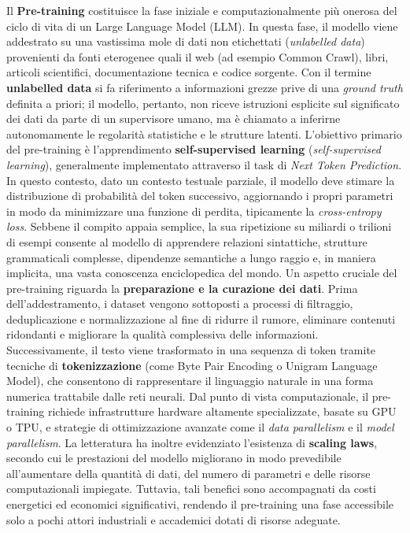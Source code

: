 Il \textbf{Pre-training} costituisce la fase iniziale e computazionalmente più onerosa del ciclo di vita di un Large Language Model (LLM). In questa fase, il modello viene addestrato su una vastissima mole di dati non etichettati (\textit{unlabelled data}) provenienti da fonti eterogenee quali il web (ad esempio Common Crawl), libri, articoli scientifici, documentazione tecnica e codice sorgente. Con il termine \textbf{unlabelled data} si fa riferimento a informazioni grezze prive di una \textit{ground truth} definita a priori; il modello, pertanto, non riceve istruzioni esplicite sul significato dei dati da parte di un supervisore umano, ma è chiamato a inferirne autonomamente le regolarità statistiche e le strutture latenti.
L'obiettivo primario del pre-training è l'apprendimento \textbf{self-supervised learning} (\textit{self-supervised learning}), generalmente implementato attraverso il task di \textit{Next Token Prediction}. In questo contesto, dato un contesto testuale parziale, il modello deve stimare la distribuzione di probabilità del token successivo, aggiornando i propri parametri in modo da minimizzare una funzione di perdita, tipicamente la \textit{cross-entropy loss}. Sebbene il compito appaia semplice, la sua ripetizione su miliardi o trilioni di esempi consente al modello di apprendere relazioni sintattiche, strutture grammaticali complesse, dipendenze semantiche a lungo raggio e, in maniera implicita, una vasta conoscenza enciclopedica del mondo.
Un aspetto cruciale del pre-training riguarda la \textbf{preparazione e la curazione dei dati}. Prima dell’addestramento, i dataset vengono sottoposti a processi di filtraggio, deduplicazione e normalizzazione al fine di ridurre il rumore, eliminare contenuti ridondanti e migliorare la qualità complessiva delle informazioni. Successivamente, il testo viene trasformato in una sequenza di token tramite tecniche di \textbf{tokenizzazione} (come Byte Pair Encoding o Unigram Language Model), che consentono di rappresentare il linguaggio naturale in una forma numerica trattabile dalle reti neurali.
Dal punto di vista computazionale, il pre-training richiede infrastrutture hardware altamente specializzate, basate su GPU o TPU, e strategie di ottimizzazione avanzate come il \textit{data parallelism} e il \textit{model parallelism}. La letteratura ha inoltre evidenziato l’esistenza di \textbf{scaling laws}, secondo cui le prestazioni del modello migliorano in modo prevedibile all’aumentare della quantità di dati, del numero di parametri e delle risorse computazionali impiegate. Tuttavia, tali benefici sono accompagnati da costi energetici ed economici significativi, rendendo il pre-training una fase accessibile solo a pochi attori industriali e accademici dotati di risorse adeguate.
